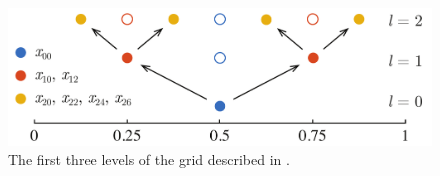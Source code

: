 \begin{figure}[t]
  \centering
  \includegraphics[width=1.0\columnwidth]{include/assets/figures/grid.pdf}
  \vspace{-1.5em}
  \caption{
    The first three levels of the grid described in .
  }
\end{figure}
